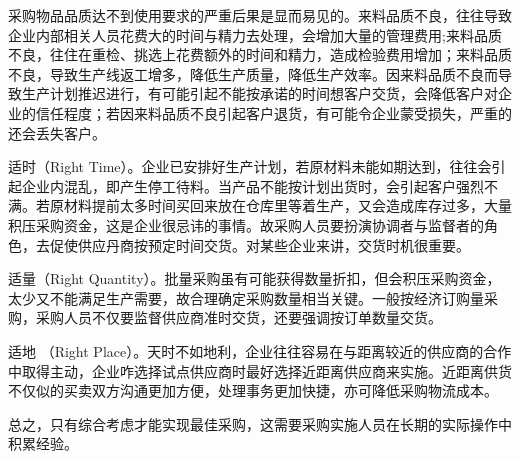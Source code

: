 \begin{enumerate.zh}
    采购物品品质达不到使用要求的严重后果是显而易见的。来料品质不良，往往导致企业内部相关人员花费大的时间与精力去处理，会增加大量的管理费用;来料品质不良，往住在重检、挑选上花费额外的时间和精力，造成检验费用增加；来料品质不良，导致生产线返工增多，降低生产质量，降低生产效率。因来料品质不良而导致生产计划推迟进行，有可能引起不能按承诺的时间想客户交货，会降低客户对企业的信任程度；若因来料品质不良引起客户退货，有可能令企业蒙受损失，严重的还会丢失客户。

    \item 适时（Right Time）。企业已安排好生产计划，若原材料未能如期达到，往往会引起企业内混乱，即产生停工待料。当产品不能按计划出货时，会引起客户强烈不满。若原材料提前太多时间买回来放在仓库里等着生产，又会造成库存过多，大量积压采购资金，这是企业很忌讳的事情。故采购人员要扮演协调者与监督者的角色，去促使供应丹商按预定时间交货。对某些企业来讲，交货时机很重要。

    \item 适量（Right Quantity）。批量采购虽有可能获得数量折扣，但会积压采购资金，太少又不能满足生产需要，故合理确定采购数量相当关键。一般按经济订购量采购，采购人员不仅要监督供应商准时交货，还要强调按订单数量交货。

    \item 适地 （Right Place）。天时不如地利，企业往往容易在与距离较近的供应商的合作中取得主动，企业咋选择试点供应商时最好选择近距离供应商来实施。近距离供货不仅似的买卖双方沟通更加方便，处理事务更加快捷，亦可降低采购物流成本。

    \end{enumerate.zh}

    总之，只有综合考虑才能实现最佳采购，这需要采购实施人员在长期的实际操作中积累经验。

